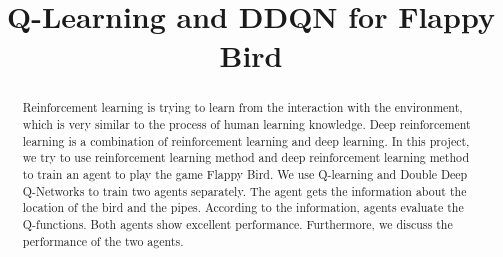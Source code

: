 \documentclass[conference,compsoc]{IEEEtran}
\begin{document}
\title{Q-Learning and DDQN for Flappy Bird}


\author{
}

\maketitle

\begin{abstract}
Reinforcement learning is trying to learn from the interaction with the environment, which is very similar to the process of human learning knowledge. Deep reinforcement learning is a combination of reinforcement learning and deep learning. In this project, we try to use reinforcement learning method and deep reinforcement learning method to train an agent to play the game Flappy Bird. We use Q-learning and Double Deep Q-Networks to train two agents separately. The agent gets the information about the location of the bird and the pipes. According to the information, agents evaluate the Q-functions. Both agents show excellent performance.
Furthermore, we discuss the performance of the two agents.
\end{abstract}


\IEEEpeerreviewmaketitle
\end{document}
